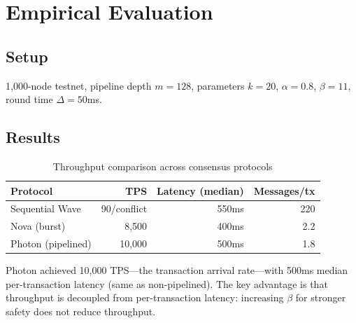 \section{Empirical Evaluation}

\label{sec:photon-evaluation}

\subsection{Setup}

1,000-node testnet, pipeline depth $m = 128$, parameters $k = 20$, $\alpha = 0.8$,
$\beta = 11$, round time $\Delta = 50$ms.

\subsection{Results}

\begin{table}[h]
\centering
\begin{tabular}{@{}lrrr@{}}
\toprule
\textbf{Protocol} & \textbf{TPS} & \textbf{Latency (median)} & \textbf{Messages/tx} \\
\midrule
Sequential Wave & 90/conflict & 550ms & 220 \\
Nova (burst) & 8,500 & 400ms & 2.2 \\
Photon (pipelined) & 10,000 & 500ms & 1.8 \\
\bottomrule
\end{tabular}
\caption{Throughput comparison across consensus protocols}
\label{tab:photon-photon-results}
\end{table}

Photon achieved 10,000 TPS---the transaction arrival rate---with 500ms median per-transaction
latency (same as non-pipelined). The key advantage is that throughput is decoupled from
per-transaction latency: increasing $\beta$ for stronger safety does not reduce throughput.

